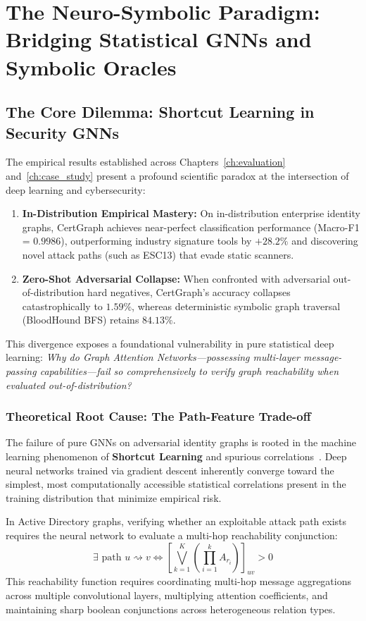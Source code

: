\chapter{The Neuro-Symbolic Paradigm: Bridging Statistical GNNs and Symbolic Oracles}
\label{ch:neuro_symbolic}

\section{The Core Dilemma: Shortcut Learning in Security GNNs}
The empirical results established across Chapters~\ref{ch:evaluation} and~\ref{ch:case_study} present a profound scientific paradox at the intersection of deep learning and cybersecurity:
\begin{enumerate}
    \item \textbf{In-Distribution Empirical Mastery:} On in-distribution enterprise identity graphs, CertGraph achieves near-perfect classification performance (Macro-F1 = $0.9986$), outperforming industry signature tools by $+28.2\%$ and discovering novel attack paths (such as ESC13) that evade static scanners.
    \item \textbf{Zero-Shot Adversarial Collapse:} When confronted with adversarial out-of-distribution hard negatives, CertGraph's accuracy collapses catastrophically to \textbf{$1.59\%$}, whereas deterministic symbolic graph traversal (BloodHound BFS) retains \textbf{$84.13\%$}.
\end{enumerate}

This divergence exposes a foundational vulnerability in pure statistical deep learning: \textit{Why do Graph Attention Networks---possessing multi-layer message-passing capabilities---fail so comprehensively to verify graph reachability when evaluated out-of-distribution?}

\subsection{Theoretical Root Cause: The Path-Feature Trade-off}
The failure of pure GNNs on adversarial identity graphs is rooted in the machine learning phenomenon of \textbf{Shortcut Learning} and spurious correlations~\cite{geirhos2020shortcut,ye2026cleverhans,bell2024pragmatic}. Deep neural networks trained via gradient descent inherently converge toward the simplest, most computationally accessible statistical correlations present in the training distribution that minimize empirical risk.

In Active Directory graphs, verifying whether an exploitable attack path exists requires the neural network to evaluate a multi-hop reachability conjunction:
\begin{equation}
\exists \text{ path } u \rightsquigarrow v \iff \left[ \bigvee_{k=1}^K \left( \prod_{i=1}^k A_{r_i} \right) \right]_{uv} > 0
\end{equation}
This reachability function requires coordinating multi-hop message aggregations across multiple convolutional layers, multiplying attention coefficients, and maintaining sharp boolean conjunctions across heterogeneous relation types.

